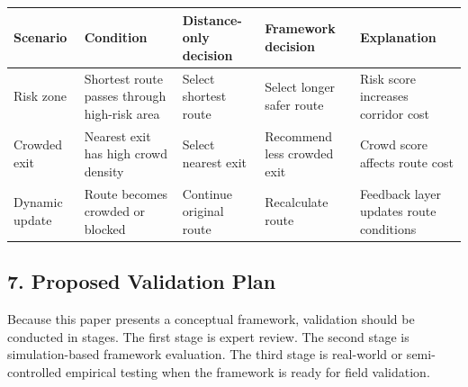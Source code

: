 \documentclass[
]{article}
\newcounter{none} %
\begin{document}
{\def\LTcaptype{none} %
\begin{longtable}[]{@{}
  >{\raggedright\arraybackslash}p{}
  >{\raggedright\arraybackslash}p{}
  >{\raggedright\arraybackslash}p{}
  >{\raggedright\arraybackslash}p{}
  >{\raggedright\arraybackslash}p{}@{}}
\toprule\noalign{}
\begin{minipage}[b]{\linewidth}\raggedright
Scenario
\end{minipage} & \begin{minipage}[b]{\linewidth}\raggedright
Condition
\end{minipage} & \begin{minipage}[b]{\linewidth}\raggedright
Distance-only decision
\end{minipage} & \begin{minipage}[b]{\linewidth}\raggedright
Framework decision
\end{minipage} & \begin{minipage}[b]{\linewidth}\raggedright
Explanation
\end{minipage} \\
\midrule\noalign{}
\endhead
\bottomrule\noalign{}
\endlastfoot
Risk zone & Shortest route passes through high-risk area & Select
shortest route & Select longer safer route & Risk score increases
corridor cost \\
Crowded exit & Nearest exit has high crowd density & Select nearest exit
& Recommend less crowded exit & Crowd score affects route cost \\
Dynamic update & Route becomes crowded or blocked & Continue original
route & Recalculate route & Feedback layer updates route conditions \\
\end{longtable}
}

\subsection{7. Proposed Validation Plan}\label{proposed-validation-plan}

Because this paper presents a conceptual framework, validation should be
conducted in stages. The first stage is expert review. The second stage
is simulation-based framework evaluation. The third stage is real-world
or semi-controlled empirical testing when the framework is ready for
field validation.
\end{document}

